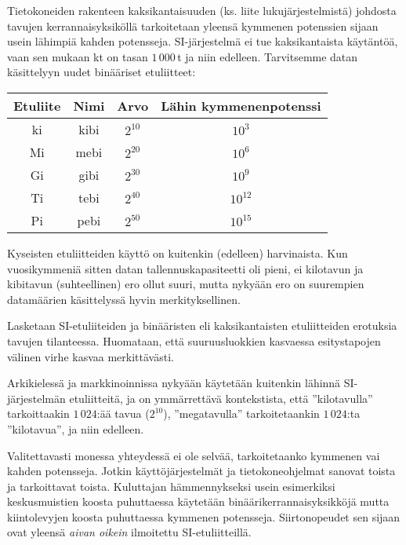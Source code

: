 Tietokoneiden rakenteen kaksikantaisuuden (ks. liite lukujärjestelmistä) johdosta tavujen kerrannaisyksiköllä tarkoitetaan yleensä kymmenen potenssien sijaan usein lähimpiä kahden potensseja. SI-järjestelmä ei tue kaksikantaista käytäntöä, vaan sen mukaan kt on tasan $1\,000$\,t ja niin edelleen. Tarvitsemme datan käsittelyyn uudet binääriset etuliitteet:

\begin{center}
\begin{tabular}{c|c|c|c}
Etuliite & Nimi & Arvo & Lähin kymmenenpotenssi \\
\hline
ki & kibi & $2^{10}$ & $10^3$	\\
Mi & mebi & $2^{20}$ & $10^6$\\
Gi & gibi & $2^{30}$ & $10^9$\\
Ti & tebi & $2^{40}$ & $10^12$ \\
Pi & pebi & $2^{50}$ & $10^15$\\
\end{tabular}
\end{center}

Kyseisten etuliitteiden käyttö on kuitenkin (edelleen) harvinaista. Kun vuosikymmeniä sitten datan tallennuskapasiteetti oli pieni, ei kilotavun ja kibitavun (suhteellinen) ero ollut suuri, mutta nykyään ero on suurempien datamäärien käsittelyssä hyvin merkityksellinen. 

\begin{esimerkki}
Lasketaan SI-etuliiteiden ja binääristen eli kaksikantaisten etuliitteiden erotuksia tavujen tilanteessa.
Huomataan, että suuruusluokkien kasvaessa esitystapojen välinen virhe kasvaa merkittävästi.
\end{esimerkki}

Arkikielessä ja markkinoinnissa nykyään käytetään kuitenkin lähinnä SI-järjestelmän etuliitteitä, ja on ymmärrettävä kontekstista, että ''kilotavulla'' tarkoittaakin $1\,024$:ää tavua ($2^{10}$), ''megatavulla'' tarkoitetaankin $1\,024$:ta ''kilotavua'', ja niin edelleen.

Valitettavasti monessa yhteydessä ei ole selvää, tarkoitetaanko kymmenen vai kahden potensseja. Jotkin käyttöjärjestelmät ja tietokoneohjelmat sanovat toista ja tarkoittavat toista. Kuluttajan hämmennykseksi usein esimerkiksi keskusmuistien koosta puhuttaessa käytetään binäärikerrannaisyksikköjä mutta kiintolevyjen koosta puhuttaessa kymmenen potensseja. Siirtonopeudet sen sijaan ovat yleensä \textit{aivan oikein} ilmoitettu SI-etuliitteillä.

